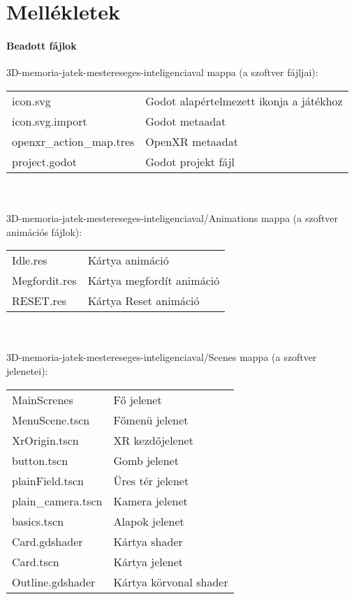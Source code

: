 \chapter{Mellékletek}
\thispagestyle{fancy}
\pagestyle{fancy}

\thispagestyle{fancy}
\pagestyle{fancy}

\subsubsection{Beadott fájlok}
\noindent 3D-memoria-jatek-mestereseges-inteligenciaval mappa (a szoftver fájljai):\\
\begin{tabular}{l l}
    \quad icon.svg  & \quad Godot alapértelmezett ikonja a játékhoz \\ 
    \quad icon.svg.import  & \quad Godot metaadat \\ 
    \quad openxr\_action\_map.tres & \quad OpenXR metaadat \\ 
    \quad project.godot  & \quad Godot projekt fájl \\ 
\end{tabular}
\\\\
\noindent 3D-memoria-jatek-mestereseges-inteligenciaval/Animations mappa (a szoftver animációs fájlok):\\
\begin{tabular}{l l}
    \quad Idle.res  & \quad Kártya animáció \\ 
    \quad Megfordit.res  & \quad Kártya megfordít animáció \\ 
    \quad RESET.res  & \quad Kártya Reset animáció \\
\end{tabular}
\\\\
\noindent 3D-memoria-jatek-mestereseges-inteligenciaval/Scenes mappa (a szoftver jelenetei):\\
\begin{tabular}{l l} 
    \quad MainScrenes  & \quad Fő jelenet\\ 
    \quad MenuScene.tscn  & \quad Főmenü jelenet \\ 
    \quad XrOrigin.tscn  & \quad XR kezdőjelenet \\ 
    \quad button.tscn  & \quad Gomb jelenet \\ 
    \quad plainField.tscn  & \quad Üres tér jelenet \\ 
    \quad plain\_camera.tscn  & \quad Kamera jelenet \\ 
    \quad basics.tscn  & \quad Alapok jelenet \\ 
    \quad Card.gdshader  & \quad Kártya shader\\ 
    \quad Card.tscn  & \quad Kártya jelenet\\ 
    \quad Outline.gdshader  & \quad Kártya körvonal shader\\ 
\end{tabular}

